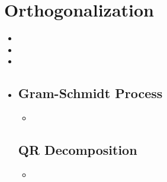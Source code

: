 \section{Orthogonalization}\label{Orthogonalization}
\begin{itemize}
  \item {}
  \item {}
  \item {}
  \item {}

  \subsection{Gram-Schmidt Process}\label{Gram-Schmidt Process}
  \begin{itemize}
    \item 
  \end{itemize}

  \subsection{QR Decomposition}\label{QR Decomposition}
  \begin{itemize}
    \item 
  \end{itemize}
  
  
\end{itemize}
